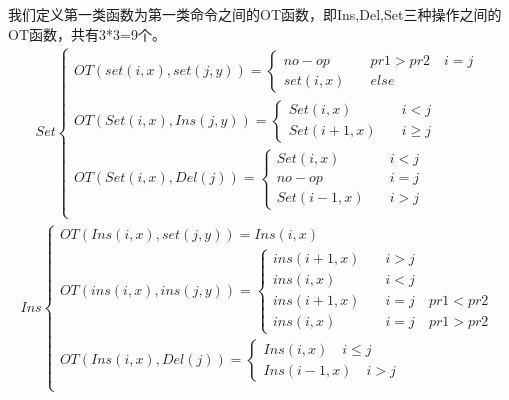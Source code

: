 我们定义第一类函数为第一类命令之间的OT函数，即Ins,Del,Set三种操作之间的OT函数，共有3*3=9个。
\begin{equation}
\begin{aligned}
Set \begin{cases}
OT(set (i,x), set (j,y)) =\begin{cases}
    no-op \quad &pr1 > pr2 \quad i=j\\
	{set (i,x)} \quad &else \end{cases} \\ 
OT(Set(i,x),Ins(j,y))=\begin{cases}
{Set(i,x)}  \quad &i<j\\
{Set(i+1,x)} \quad  &i\ge j \end{cases} \\
OT(Set(i,x),Del(j))=\begin{cases}
{Set(i,x)} \quad &i<j\\
{no-op} \quad & i=j\\
{Set(i-1,x)} \quad &i>j \end{cases} \\
\end{cases}
\end{aligned}
\end{equation}
\begin{equation}
\begin{aligned}
Ins \begin{cases}
OT(Ins(i,x), set (j,y)) =
{Ins(i,x)}\\
OT(ins (i,x), ins (j,y)) =\begin{cases}
	{ins(i+1, x)}   \quad & i > j\\
	{ins(i, x)}    \quad & i < j\\
	{ins(i+1, x)}   \quad  & i = j \quad pr1 < pr2\\
	{ins(i, x)}   \quad  & i = j \quad pr1 > pr2 \end{cases} \\
OT(Ins(i,x),Del(j))=\begin{cases}
{Ins(i,x)}  \quad i \le j\\
{Ins(i-1,x)} \quad i>j \end{cases}\\
\end{cases}
\end{aligned}
\end{equation}


